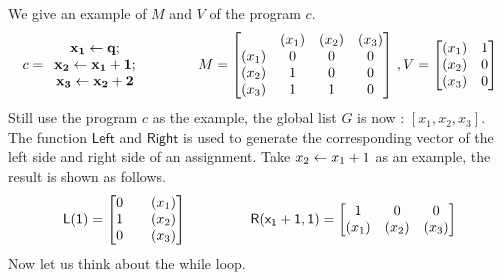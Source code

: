 \documentclass[a4paper,11pt]{article}
\begin{document}
We give an example of $M$ and $V$ of the program $c$.   
$$
c= \begin{array}{c}
\ssa{\assign {x_1} {q}} ;        \\
\ssa{\assign {x_2} {x_1+1}} ;\\
\ssa{\assign {x_3} {x_2+2} }
\end{array}~~~~~~~~~~~~
M =  \left[ \begin{matrix}
 & (x_1) & (x_2) & (x_3) \\
(x_1) & 0 & 0 & 0 \\
(x_2) & 1 & 0 & 0 \\
(x_3) & 1 & 1 & 0 \\
\end{matrix} \right] ~ , V = \left [ \begin{matrix}
(x_1) &  1 \\
(x_2) & 0 \\
(x_3) & 0 \\
\end{matrix} \right ]
$$
Still use the program $c$ as the example, the global list $G$ is now : $ [ x_1 , x_2 , x_3] $. 
The function $\mathsf{Left}$ and $\mathsf{Right}$ is used to generate the corresponding vector of the left side and right side of an assignment. Take $\mathrel{ x_2 \leftarrow x_1+1 } $ as an example, the result is shown as follows.
\[
\sf{L}(1) = \left[ \begin{matrix}
 0  & ~~~(x_1) \\
 1 & ~~~(x_2) \\
 0 & ~~~(x_3) \\
\end{matrix}   \right ] ~~~~~~~~~~~~~~
\sf{R} (x_1+1, 1) = \left[ \begin{matrix} 
   1 & 0 & 0 \\
   (x_1) & (x_2) & (x_3) \\
\end{matrix}  \right]
\]
Now let us think about the while loop.
%
\end{document}

